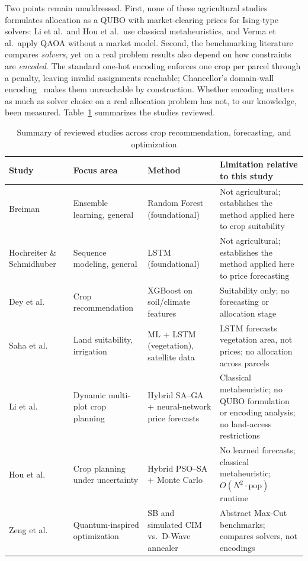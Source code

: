 \documentclass[conference,a4paper]{IEEEtran}
\begin{document}
Two points remain unaddressed. First, none of these agricultural studies
formulates allocation as a QUBO with market-clearing prices for Ising-type
solvers: Li et al.\ and Hou et al.\ use classical metaheuristics, and Verma et
al.\ apply QAOA without a market model. Second, the benchmarking literature
compares \emph{solvers}, yet on a real problem results also depend on how
constraints are \emph{encoded}. The standard one-hot encoding enforces one
crop per parcel through a penalty, leaving invalid assignments reachable;
Chancellor's domain-wall encoding~\cite{chancellor2019} makes them
unreachable by construction. Whether encoding matters as much as solver choice
on a real allocation problem has not, to our knowledge, been measured.
Table~\ref{tab:lit} summarizes the studies reviewed.

\begin{table}[t]
\centering
\caption{Summary of reviewed studies across crop recommendation, forecasting, and optimization}
\label{tab:lit}
\footnotesize
\begin{tabular}{p{2.6cm}p{3.3cm}p{4.2cm}p{6.2cm}}
\toprule
Study & Focus area & Method & Limitation relative to this study \\
\midrule
Breiman~\cite{breiman2001} & Ensemble learning, general & Random Forest (foundational) & Not agricultural; establishes the method applied here to crop suitability \\
Hochreiter \& Schmidhuber~\cite{hochreiter1997} & Sequence modeling, general & LSTM (foundational) & Not agricultural; establishes the method applied here to price forecasting \\
Dey et al.~\cite{dey2024} & Crop recommendation & XGBoost on soil/climate features & Suitability only; no forecasting or allocation stage \\
Saha et al.~\cite{saha2025} & Land suitability, irrigation & ML + LSTM (vegetation), satellite data & LSTM forecasts vegetation area, not prices; no allocation across parcels \\
Li et al.~\cite{li2025} & Dynamic multi-plot crop planning & Hybrid SA--GA + neural-network price forecasts & Classical metaheuristic; no QUBO formulation or encoding analysis; no land-access restrictions \\
Hou et al.~\cite{hou2026} & Crop planning under uncertainty & Hybrid PSO--SA + Monte Carlo & No learned forecasts; classical metaheuristic; $O(N^2\cdot\mathrm{pop})$ runtime \\
Zeng et al.~\cite{zeng2024} & Quantum-inspired optimization & SB and simulated CIM vs.\ D-Wave annealer & Abstract Max-Cut benchmarks; compares solvers, not encodings \\

\end{tabular}
\end{table}
\end{document}
